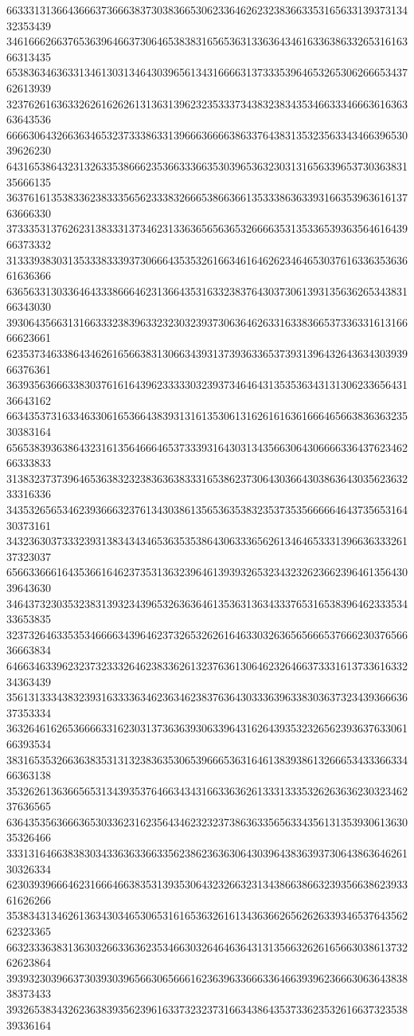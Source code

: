 66333131366436663736663837303836653062336462623238366335316563313937313432353439
34616662663765363964663730646538383165653631336364346163363863326531616366313435
65383634636331346130313464303965613431666631373335396465326530626665343762613939
32376261636332626162626131363139623235333734383238343534663334666361636363643536
66663064326636346532373338633139666366663863376438313532356334346639653039626230
64316538643231326335386662353663336635303965363230313165633965373036383135666135
36376161353833623833356562333832666538663661353338636339316635396361613763666330
37333531376262313833313734623133636565636532666635313533653936356461643966373332
31333938303135333833393730666435353261663461646262346465303761633635363661636366
63656331303364643338666462313664353163323837643037306139313563626534383166343030
39306435663131663332383963323230323937306364626331633836653733633161316666623661
62353734633864346261656638313066343931373936336537393139643264363430393966376361
36393563666338303761616439623333303239373464643135353634313130623365643136643162
66343537316334633061653664383931316135306131626161636166646566383636323530383164
65653839363864323161356466646537333931643031343566306430666633643762346266333833
31383237373964653638323238363638333165386237306430366430386364303562363233316336
34353265653462393666323761343038613565363538323537353566666464373565316430373161
34323630373332393138343434653635353864306333656261346465333139663633326137323037
65663366616435366164623735313632396461393932653234323262366239646135643039643630
34643732303532383139323439653263636461353631363433376531653839646233353433653835
32373264633535346666343964623732653262616463303263656566653766623037656636663834
64663463396232373233326462383362613237636130646232646637333161373361633234363439
35613133343832393163333634623634623837636430333639633830363732343936663637353334
36326461626536666331623031373636393063396431626439353232656239363763306166393534
38316535326636383531313238363530653966653631646138393861326665343336633466363138
35326261363665653134393537646634343166336362613331333532626363623032346237636565
63643535636663653033623162356434623232373863633565633435613135393061363035326466
33313164663838303433636336633562386236363064303964383639373064386364626130326334
62303939666462316664663835313935306432326632313438663866323935663862393361626266
35383431346261363430346530653161653632616134363662656262633934653764356262323365
66323336383136303266336362353466303264646364313135663262616566303861373262623864
39393230396637303930396566306566616236396336663364663939623666306364383838373433
39326538343262363839356239616337323237316634386435373362353261663732353839336164
